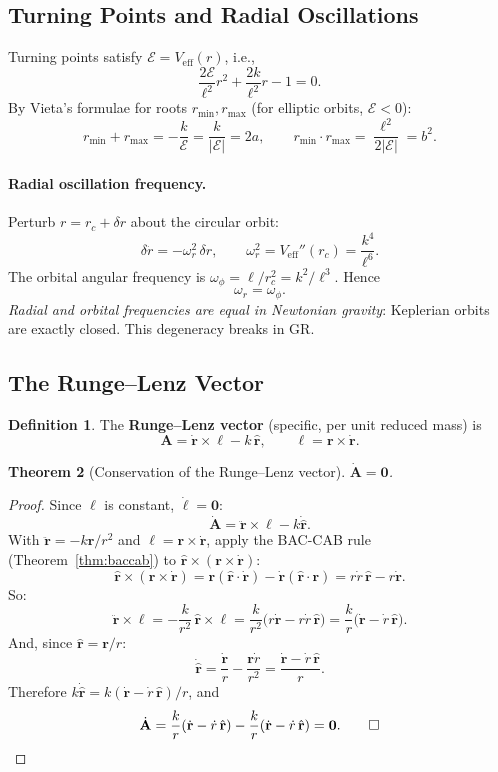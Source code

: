 \documentclass[12pt,a4paper]{article}
\theoremstyle{plain}
\newtheorem{theorem}{Theorem}[section]
\theoremstyle{definition}
\newtheorem{definition}[theorem]{Definition}
\theoremstyle{remark}
\newcommand{\ve}[1]{\mathbf{#1}}           %
\newcommand{\er}{\hat{\mathbf{r}}}
\newcommand{\lv}{\boldsymbol{\ell}}
\newcommand{\Av}{\ve{A}}
\newcommand{\rv}{\ve{r}}
\begin{document}
\subsection{Turning Points and Radial Oscillations}

Turning points satisfy $\mathcal{E} = V_{\mathrm{eff}}(r)$, i.e.,
\[
  \frac{2\mathcal{E}}{\ell^2}r^2 + \frac{2k}{\ell^2}r - 1 = 0.
\]
By Vieta's formulae for roots $r_{\min},r_{\max}$ (for elliptic orbits, $\mathcal{E}<0$):
\[
  r_{\min}+r_{\max} = -\frac{k}{\mathcal{E}} = \frac{k}{|\mathcal{E}|} = 2a,
  \qquad
  r_{\min}\cdot r_{\max} = \frac{\ell^2}{2|\mathcal{E}|} = b^2.
\]

\paragraph{Radial oscillation frequency.} Perturb $r = r_c + \delta r$ about the circular orbit:
\[
  \delta\ddot{r} = -\omega_r^2\,\delta r,
  \qquad
  \omega_r^2 = V_{\mathrm{eff}}''(r_c) = \frac{k^4}{\ell^6}.
\]
The orbital angular frequency is $\omega_\phi = \ell/r_c^2 = k^2/\ell^3$. Hence
\[
  \omega_r = \omega_\phi.
\]
\textit{Radial and orbital frequencies are equal in Newtonian gravity}: Keplerian orbits are exactly closed. This degeneracy breaks in GR.

\subsection{The Runge--Lenz Vector}

\begin{definition}
The \textbf{Runge--Lenz vector} (specific, per unit reduced mass) is
\[
  \Av = \dot{\rv}\times\lv - k\,\er,
  \qquad
  \lv = \rv\times\dot{\rv}.
\]
\end{definition}

\begin{theorem}[Conservation of the Runge--Lenz vector]\label{thm:RL}
$\dot{\Av} = \ve{0}$.
\end{theorem}
\begin{proof}
Since $\lv$ is constant, $\dot{\lv}=\ve{0}$:
\[
  \dot{\Av} = \ddot{\rv}\times\lv - k\dot{\er}.
\]
With $\ddot{\rv}=-k\er/r^2$ and $\lv=\rv\times\dot{\rv}$, apply the BAC-CAB rule (Theorem~\ref{thm:baccab}) to $\er\times(\rv\times\dot{\rv})$:
\[
  \er\times(\rv\times\dot{\rv})
  = \rv(\er\cdot\dot{\rv}) - \dot{\rv}(\er\cdot\rv)
  = r\dot{r}\,\er - r\dot{\rv}.
\]
So:
\[
  \ddot{\rv}\times\lv
  = -\frac{k}{r^2}\,\er\times\lv
  = \frac{k}{r^2}\bigl(r\dot{\rv}-r\dot{r}\,\er\bigr)
  = \frac{k}{r}\bigl(\dot{\rv}-\dot{r}\,\er\bigr).
\]
And, since $\er = \rv/r$:
\[
  \dot{\er}
  = \frac{\dot{\rv}}{r} - \frac{\rv\dot{r}}{r^2}
  = \frac{\dot{\rv}-\dot{r}\,\er}{r}.
\]
Therefore $k\dot{\er} = k(\dot{\rv}-\dot{r}\,\er)/r$, and
\[
  \dot{\Av} = \frac{k}{r}(\dot{\rv}-\dot{r}\,\er) - \frac{k}{r}(\dot{\rv}-\dot{r}\,\er) = \ve{0}. \qed
\]
\end{proof}
\end{document}

